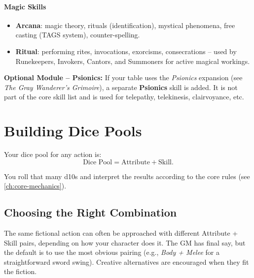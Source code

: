 \paragraph{Magic Skills}
\begin{itemize}
  \item \textbf{Arcana}: magic theory, rituals (identification), mystical phenomena, free casting (TAGS system), counter-spelling.
  \item \textbf{Ritual}: performing rites, invocations, exorcisms, consecrations -- used by Runekeepers, Invokers, Cantors, and Summoners for active magical workings.
\end{itemize}

\noindent\textbf{Optional Module -- Psionics:} If your table uses the \textit{Psionics} expansion (see \textit{The Gray Wanderer's Grimoire}), a separate \textbf{Psionics} skill is added. It is not part of the core skill list and is used for telepathy, telekinesis, clairvoyance, etc.

\newpage
\section{Building Dice Pools}
\label{sec:dice-pools}

Your dice pool for any action is:
\[
\text{Dice Pool} = \text{Attribute} + \text{Skill}.
\]

You roll that many d10s and interpret the results according to the core rules
(see \ref{ch:core-mechanics}).

\subsection{Choosing the Right Combination}
\label{sec:attribute-skill-pairs}

The same fictional action can often be approached with different Attribute + Skill
pairs, depending on how your character does it. The GM has final say, but the
default is to use the most obvious pairing (e.g., \textit{Body + Melee} for a
straightforward sword swing). Creative alternatives are encouraged when they
fit the fiction.

